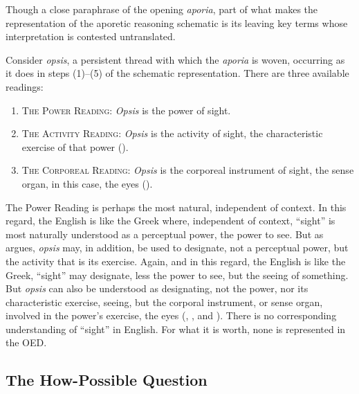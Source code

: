 Though a close paraphrase of the opening \emph{aporia}, part of what makes the representation of the aporetic reasoning schematic is its leaving key terms whose interpretation is contested untranslated. 

Consider \emph{opsis}, a persistent thread with which the \emph{aporia} is woven, occurring as it does in steps (1)–(5) of the schematic representation. There are three available readings:
\begin{enumerate}[(1)]
	\item \textsc{The Power Reading}: \emph{Opsis} is the power of sight.
	\item \textsc{The Activity Reading}: \emph{Opsis} is the activity of sight, the characteristic exercise of that power (\citealt{caston02}).
	\item \textsc{The Corporeal Reading}: \emph{Opsis} is the corporeal instrument of sight, the sense organ, in this case, the eyes (\citealt{Trubowitz:2025aa}).
\end{enumerate}
The Power Reading is perhaps the most natural, independent of context. In this regard, the English is like the Greek where, independent of context, ``sight'' is most naturally understood as a perceptual power, the power to see. But as \citet{caston02} argues, \emph{opsis} may, in addition, be used to designate, not a perceptual power, but the activity that is its exercise. Again, and in this regard, the English is like the Greek, ``sight'' may designate, less the power to see, but the seeing of something. But \emph{opsis} can also be understood as designating, not the power, nor its characteristic exercise, seeing, but the corporal instrument, or sense organ, involved in the power's exercise, the eyes (\citealt[]{Bonitz:1870aa}, \citealt[]{Hicks:1907uq}, and \citealt{Trubowitz:2025aa}). There is no corresponding understanding of ``sight'' in English. For what it is worth, none is represented in the OED.



\subsection{The How-Possible Question} %
\label{sub:the_how_possible_question}

